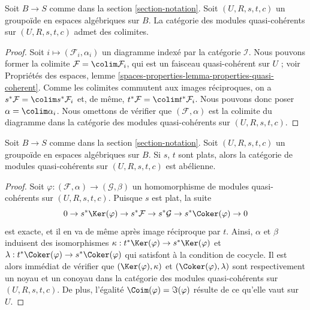 \begin{lemma}
\label{lemma-colimits}
Soit $B \to S$ comme dans la section \ref{section-notation}. Soit $(U, R, s, t, c)$ un groupoïde en espaces algébriques sur $B$. La catégorie des modules quasi-cohérents sur $(U, R, s, t, c)$ admet des colimites.
\end{lemma}

\begin{proof}
Soit $i \mapsto (\mathcal{F}_i, \alpha_i)$ un diagramme indexé par la catégorie $\mathcal{I}$. Nous pouvons former la colimite $\mathcal{F} = \colim \mathcal{F}_i$, qui est un faisceau quasi-cohérent sur $U$ ; voir Propriétés des espaces, lemme \ref{spaces-properties-lemma-properties-quasi-coherent}. Comme les colimites commutent aux images réciproques, on a $s^*\mathcal{F} = \colim s^*\mathcal{F}_i$ et, de même, $t^*\mathcal{F} = \colim t^*\mathcal{F}_i$. Nous pouvons donc poser $\alpha = \colim \alpha_i$. Nous omettons de vérifier que $(\mathcal{F}, \alpha)$ est la colimite du diagramme dans la catégorie des modules quasi-cohérents sur $(U, R, s, t, c)$.
\end{proof}

\begin{lemma}
\label{lemma-abelian}
Soit $B \to S$ comme dans la section \ref{section-notation}. Soit $(U, R, s, t, c)$ un groupoïde en espaces algébriques sur $B$. Si $s$, $t$ sont plats, alors la catégorie de modules quasi-cohérents sur $(U, R, s, t, c)$ est abélienne.
\end{lemma}

\begin{proof}
Soit $\varphi : (\mathcal{F}, \alpha) \to (\mathcal{G}, \beta)$ un homomorphisme de modules quasi-cohérents sur $(U, R, s, t, c)$. Puisque $s$ est plat, la suite
$$
0 \to s^*\Ker(\varphi)
\to s^*\mathcal{F} \to s^*\mathcal{G} \to s^*\Coker(\varphi) \to 0
$$
est exacte, et il en va de même après image réciproque par $t$. Ainsi, $\alpha$ et $\beta$ induisent des isomorphismes $\kappa : t^*\Ker(\varphi) \to s^*\Ker(\varphi)$ et $\lambda : t^*\Coker(\varphi) \to s^*\Coker(\varphi)$ qui satisfont à la condition de cocycle. Il est alors immédiat de vérifier que $(\Ker(\varphi), \kappa)$ et $(\Coker(\varphi), \lambda)$ sont respectivement un noyau et un conoyau dans la catégorie des modules quasi-cohérents sur $(U, R, s, t, c)$. De plus, l'égalité $\Coim(\varphi) = \Im(\varphi)$ résulte de ce qu'elle vaut sur $U$.
\end{proof}










